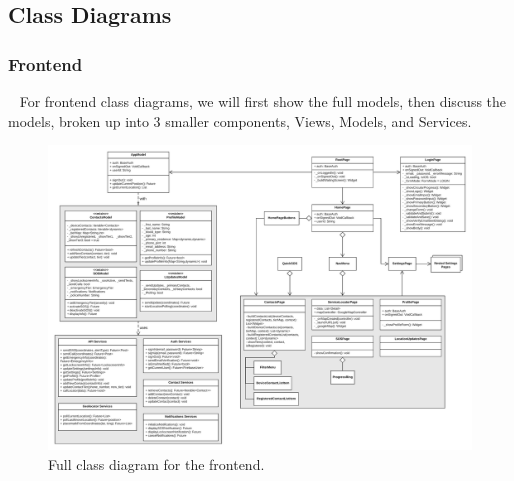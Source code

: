 \documentclass[10pt, a4paper]{article}
\begin{document}
\subsection{Class Diagrams}
\subsubsection{Frontend}
\par ~ For frontend class diagrams, we will first show the full models, then discuss the models, broken up into 3 smaller components, Views, Models, and Services. 
\begin{figure}[H]
\begin{center}
\centerline{
	\includegraphics[scale=.13]{final-diagrams/EmergenSeek-Class-Diagram.png}
}
\caption{Full class diagram for the frontend.}
\end{center}	
\end{figure}
\end{document}
